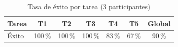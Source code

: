 \begin{table}[htbp]
\centering
\caption{Tasa de éxito por tarea (3 participantes)}
\label{tab:usab_tareas}
\begin{tabular}{@{}lccccc c@{}}
\toprule
Tarea & T1 & T2 & T3 & T4 & T5 & Global \\
\midrule
Éxito & 100\,\% & 100\,\% & 100\,\% & 83\,\% & 67\,\% & 90\,\% \\
\bottomrule
\end{tabular}
\fuentepropia
\end{table}
